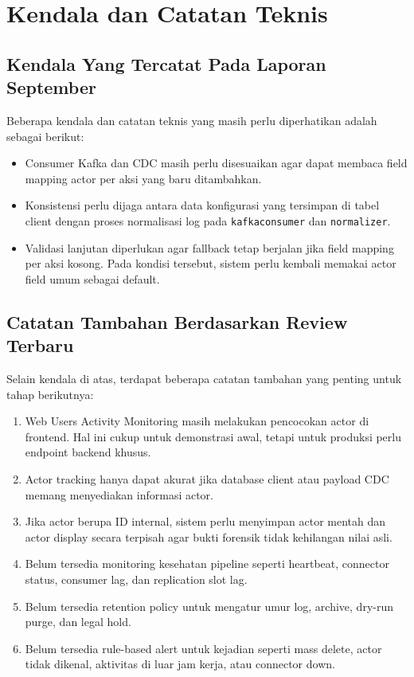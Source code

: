 \chapter{Kendala dan Catatan Teknis}

\section{Kendala Yang Tercatat Pada Laporan September}

Beberapa kendala dan catatan teknis yang masih perlu diperhatikan adalah sebagai berikut:

\begin{itemize}
    \item Consumer Kafka dan CDC masih perlu disesuaikan agar dapat membaca field mapping actor per aksi yang baru ditambahkan.
    \item Konsistensi perlu dijaga antara data konfigurasi yang tersimpan di tabel client dengan proses normalisasi log pada \texttt{kafkaconsumer} dan \texttt{normalizer}.
    \item Validasi lanjutan diperlukan agar fallback tetap berjalan jika field mapping per aksi kosong. Pada kondisi tersebut, sistem perlu kembali memakai actor field umum sebagai default.
\end{itemize}

\section{Catatan Tambahan Berdasarkan Review Terbaru}

Selain kendala di atas, terdapat beberapa catatan tambahan yang penting untuk tahap berikutnya:

\begin{enumerate}
    \item Web Users Activity Monitoring masih melakukan pencocokan actor di frontend. Hal ini cukup untuk demonstrasi awal, tetapi untuk produksi perlu endpoint backend khusus.
    \item Actor tracking hanya dapat akurat jika database client atau payload CDC memang menyediakan informasi actor.
    \item Jika actor berupa ID internal, sistem perlu menyimpan actor mentah dan actor display secara terpisah agar bukti forensik tidak kehilangan nilai asli.
    \item Belum tersedia monitoring kesehatan pipeline seperti heartbeat, connector status, consumer lag, dan replication slot lag.
    \item Belum tersedia retention policy untuk mengatur umur log, archive, dry-run purge, dan legal hold.
    \item Belum tersedia rule-based alert untuk kejadian seperti mass delete, actor tidak dikenal, aktivitas di luar jam kerja, atau connector down.
\end{enumerate}

